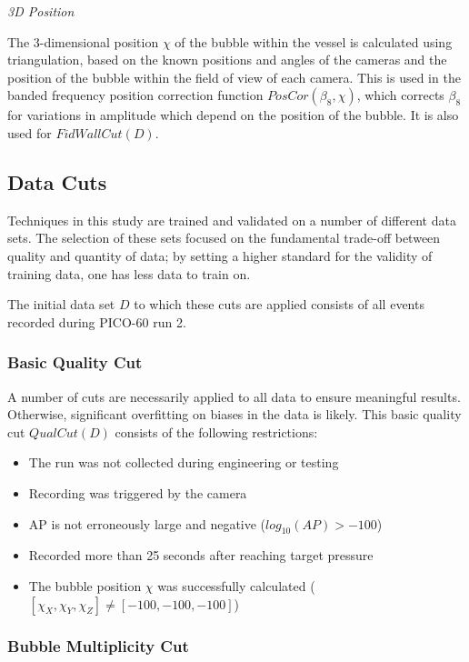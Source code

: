 \documentclass[10pt]{article}
\begin{document}
\textit{3D Position}

The 3-dimensional position $\chi$ of the bubble within the vessel is calculated using triangulation, based on the known positions and angles of the cameras and the position of the bubble within the field of view of each camera. This is used in the banded frequency position correction function $PosCor(\beta _{8}, \chi)$, which corrects $\beta _{8}$ for variations in amplitude which depend on the position of the bubble. It is also used for $FidWallCut(D)$.

\subsection{Data Cuts}

Techniques in this study are trained and validated on a number of different data sets. The selection of these sets focused on the fundamental trade-off between quality and quantity of data; by setting a higher standard for the validity of training data, one has less data to train on.

The initial data set $D$ to which these cuts are applied consists of all events recorded during PICO-60 run 2.

\subsubsection{Basic Quality Cut}

A number of cuts are necessarily applied to all data to ensure meaningful results. Otherwise, significant overfitting on biases in the data is likely. This basic quality cut $QualCut(D)$ consists of the following restrictions:

\begin{itemize}
    \item The run was not collected during engineering or testing
    \item Recording was triggered by the camera
    \item AP is not erroneously large and negative ($log_{10}(AP)>-100$)
    \item Recorded more than 25 seconds after reaching target pressure
    \item The bubble position $\chi$ was successfully calculated ($[\chi_{X}, \chi_{Y}, \chi_{Z}]\neq[-100, -100, -100]$)
\end{itemize}

\subsubsection{Bubble Multiplicity Cut}
\end{document}
